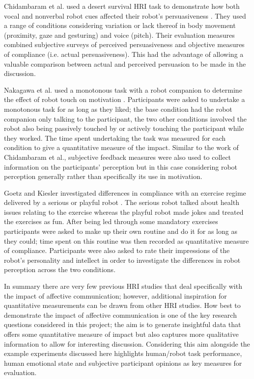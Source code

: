 \documentclass[11pt,a4paper]{report}
\begin{document}
Chidambaram et al. used a desert survival HRI task to demonstrate how both vocal and nonverbal robot cues affected their robot's persuasiveness \cite{chidambaram2012designing}. They used a range of conditions considering variation or lack thereof in body movement (proximity, gaze and gesturing) and voice (pitch). Their evaluation measures combined subjective surveys of perceived persuasiveness and objective measures of compliance (i.e. actual persuasiveness). This had the advantage of allowing a valuable comparison between actual and perceived persuasion to be made in the discussion. 

Nakagawa et al. used a monotonous task with a robot companion to determine the effect of robot touch on motivation \cite{nakagawa2011effect}. Participants were asked to undertake a monotonous task for as long as they liked; the base condition had the robot companion only talking to the participant, the two other conditions involved the robot also being passively touched by or actively touching the participant while they worked. The time spent undertaking the task was measured for each condition to give a quantitative measure of the impact. Similar to the work of Chidambaram et al., subjective feedback measures were also used to collect information on the participants' perception but in this case considering robot perception generally rather than specifically its use in motivation. 

Goetz and Kiesler investigated differences in compliance with an exercise regime delivered by a serious or playful robot \cite{goetz2002cooperation}. The serious robot talked about health issues relating to the exercise whereas the playful robot made jokes and treated the exercises as fun. After being led through some mandatory exercises participants were asked to make up their own routine and do it for as long as they could; time spent on this routine was then recorded as quantitative measure of compliance. Participants were also asked to rate their impressions of the robot's personality and intellect in order to investigate the differences in robot perception across the two conditions.

In summary there are very few previous HRI studies that deal specifically with the impact of affective communication; however, additional inspiration for quantitative measurements can be drawn from other HRI studies. How best to demonstrate the impact of affective communication is one of the key research questions considered in this project; the aim is to generate insightful data that offers some quantitative measure of impact but also captures more qualitative information to allow for interesting discussion. Considering this aim alongside the example experiments discussed here highlights human/robot task performance, human emotional state and subjective participant opinions as key measures for evaluation.
\end{document}
